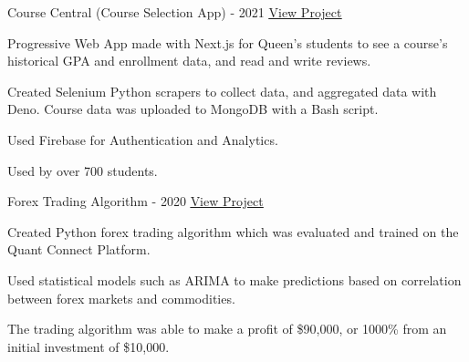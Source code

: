 

\begin{cventries}

  \cventry
    {} %
    {Course Central (Course Selection App) - 2021} %
    {\href{https://coursecentral.ca/}{\underline{View Project}}} %
    {} %
    {
      \begin{cvitems} %
        \item {Progressive Web App made with Next.js for Queen's students to see a course's historical GPA and enrollment data, and read and write reviews.}
        \item {Created Selenium Python scrapers to collect data, and aggregated data with Deno. Course data was uploaded to MongoDB with a Bash script.}
        \item {Used Firebase for Authentication and Analytics.}
        \item {Used by over 700 students.}
      \end{cvitems}
    }

  \cventry
    {} %
    {Forex Trading Algorithm - 2020} %
    {\href{https://github.com/KnlnKS/Forex-Price-Predictor-Quantconnect}{\underline{View Project}}} %
    {} %
    {
      \begin{cvitems} %
        \item {Created Python forex trading algorithm which was evaluated and trained on the Quant Connect Platform.}
        \item {Used statistical models such as ARIMA to make predictions based on correlation between forex markets and commodities.}
        \item {The trading algorithm was able to make a profit of \$90,000, or 1000\% from an initial investment of \$10,000.}
      \end{cvitems}
    }


\end{cventries}
